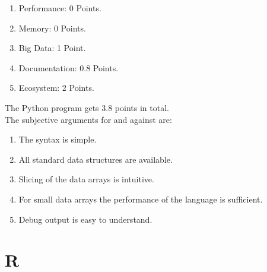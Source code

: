 \documentclass[
  twoside,
  11pt, a4paper,
  footinclude=true,
  headinclude=true,
  cleardoublepage=empty
]{scrreprt}
\begin{document}
    \begin{enumerate}
        \item Performance: 0 Points.
        \item Memory: 0 Points.
        \item Big Data: 1 Point.
        \item Documentation: 0.8 Points.
        \item Ecosystem: 2 Points.
    \end{enumerate} 
    The Python program gets 3.8 points in total.\\
    The subjective arguments for and against are: 
    \begin{enumerate}
        \item The syntax is simple.
        \item All standard data structures are available.
        \item Slicing of the data arrays is intuitive.
        \item For small data arrays the performance of the language is sufficient.
        \item Debug output is easy to understand.
    \end{enumerate}  
    
    \chapter{R}
\end{document}
